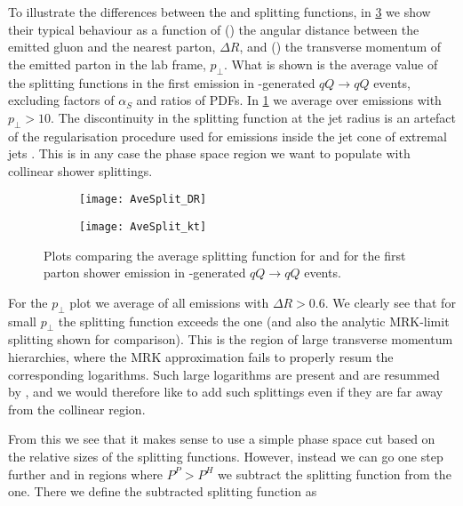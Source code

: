  To illustrate the differences between the
  \HEJ and \pyt splitting functions, in \cref{fig:splitPlots} we show
  their typical behaviour as a function of () the angular distance between the
  emitted gluon and the nearest parton, $\Delta R$, and () the transverse
  momentum of the emitted parton in the lab frame, $p_\perp$. What is
  shown is the average value of the splitting functions in the first
  emission in \HEJ-generated $qQ\rightarrow qQ$ events, excluding
  factors of $\alpha_S$ and ratios of PDFs.
  In \cref{fig:splitDR} we average over emissions with $p_\perp>10$\GeV. 
  The
  discontinuity in the \HEJ splitting function at the jet radius is an
  artefact of the regularisation procedure used for emissions inside the
  jet cone of extremal jets \cite{Andersen:2011hs}. 
  This is in any case the
  phase space region we want to populate with collinear shower
  splittings.

  \begin{figure}[t]
\centering
\begin{subfigure}{0.495\linewidth}
        \texttt{[image: AveSplit\_DR]}
    \caption{}
    \label{fig:splitDR}
  \end{subfigure}
  \begin{subfigure}{0.495\linewidth}
        \texttt{[image: AveSplit\_kt]}
    \caption{}
    \label{fig:splitkt}
  \end{subfigure}
  \caption{Plots comparing the average splitting function for \HEJ and \pyt for the first parton shower
  emission in \HEJ-generated $qQ\rightarrow qQ$ events.}
  \label{fig:splitPlots}
\end{figure}
  
For the $p_\perp$ plot we average of all
  emissions with $\Delta R>0.6$. We clearly see that for small
  $p_\perp$ the \pyt splitting function exceeds the \HEJ one (and
  also the analytic MRK-limit splitting shown for comparison). This
  is the region of large transverse momentum hierarchies, where the
  MRK approximation fails to properly resum the corresponding
  logarithms. Such large logarithms are present and are resummed by
  \pyt, and we would therefore like to add such splittings even if
  they are far away from the collinear region.

  From this we see that it makes sense to use a simple phase space cut
  based on the relative sizes of the splitting functions. 
  However, instead we can go one step further and in regions where 
  $P^P>P^H$ we subtract the \HEJ splitting function from the \pyt one.
  There we define the subtracted \pyt splitting function as

